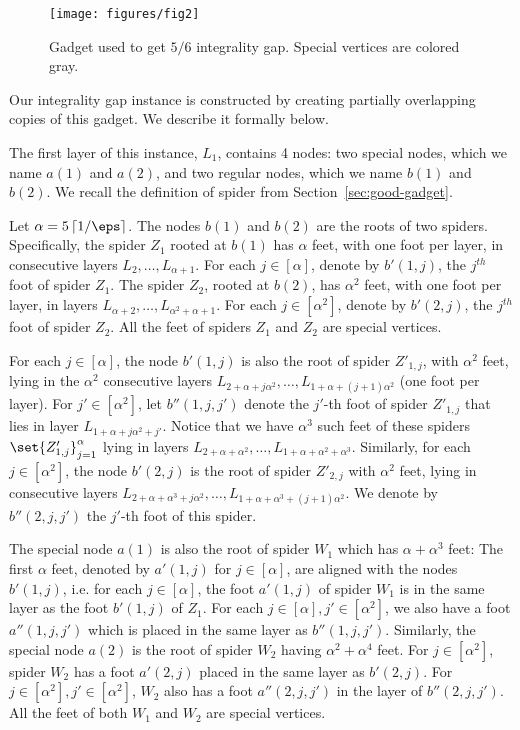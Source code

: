 \begin{wrapfigure}[13]{r}{0.25\textwidth}
\centering
\texttt{[image: figures/fig2]}
\caption{Gadget used to get $5/6$ integrality gap. Special vertices are colored gray.}
\label{12intgap:gadget}
\end{wrapfigure}

Our integrality gap instance is constructed by creating partially overlapping copies of this gadget.
We describe it formally below.   


\vspace{0.1in} 

The first layer of this instance, $L_1$, contains 4 nodes: two special nodes, which we
name $a(1)$ and $a(2)$, and two regular nodes, which we name $b(1)$ and $b(2)$.
We recall the definition of spider from Section~\ref{sec:good-gadget}.  


Let $\alpha = 5\left\lceil 1/\eps \right\rceil$. The nodes $b(1)$ and $b(2)$ are
the roots of two spiders. 
Specifically, the spider $Z_1$ rooted at $b(1)$ has $\alpha$ feet, with one foot per layer, in consecutive layers $L_2,\ldots, L_{\alpha+1}$. For each $j \in [\alpha]$, denote by $b'(1,j)$, the $j^{th}$ foot of spider $Z_1$.  
The spider $Z_2$, rooted at $b(2)$, has $\alpha^2$ feet, with one foot per layer, in layers $L_{\alpha+2}, \ldots, L_{\alpha^2+\alpha+1}$. 
For each $j \in [\alpha^2]$, denote by $b'(2,j)$, the $j^{th}$ foot of spider $Z_2$.  
All the feet of spiders $Z_1$ and $Z_2$ are special vertices. 

For each $j \in [\alpha]$, the node $b'(1,j)$ is also the root of spider $Z'_{1,j}$, with $\alpha^2$ feet, lying in the $\alpha^2$ consecutive layers $L_{2+\alpha + j \alpha^2},\ldots, L_{1+\alpha+ (j+1) \alpha^2}$ (one foot per layer).
For $j' \in [\alpha^2]$, let $b''(1,j,j')$ denote the $j'$-th foot of spider $Z'_{1,j}$ that lies in layer $L_{1+\alpha+j\alpha^2 +j'}$.  
Notice that we have $\alpha^3$ such feet of these spiders $\set{Z'_{1,j}}_{j=1}^{\alpha}$ lying in layers $L_{2+\alpha+\alpha^2}, \ldots, L_{1+\alpha+\alpha^2+\alpha^3}$. 
Similarly, for each $j \in [\alpha^2]$, the node $b'(2,j)$ is the root of spider $Z'_{2,j}$ with $\alpha^2$ feet, lying in consecutive layers $L_{2+\alpha+\alpha^3 + j\alpha^2}, \ldots, L_{1+\alpha+ \alpha^3 + (j+1)\alpha^2}$. 
We denote by $b''(2,j,j')$ the $j'$-th foot of this spider.  

The special node $a(1)$ is also the root of spider $W_1$ which has $\alpha + \alpha^3$ feet: The first $\alpha$ feet, denoted by $a'(1,j)$ for $j \in [\alpha]$, are aligned with the nodes $b'(1,j)$, i.e. for each $j \in [\alpha]$, the foot $a'(1,j)$ of spider $W_1$ is in the same layer as the foot $b'(1,j)$ of $Z_1$. 
For each $j \in [\alpha], j' \in [\alpha^2]$, we also have a foot $a''(1,j,j')$ which is placed in the same layer as $b''(1,j,j')$.
Similarly, the special node $a(2)$ is the root of spider $W_2$ having $\alpha^2 + \alpha^4$ feet. 
For $j \in [\alpha^2]$, spider $W_2$ has a foot $a'(2,j)$ placed in the same layer as $b'(2,j)$. 
For $j \in [\alpha^2], j' \in [\alpha^2]$, $W_2$ also has a foot $a''(2,j,j')$ in the layer of $b''(2,j,j')$.  
All the feet of both $W_1$ and $W_2$ are special vertices.

